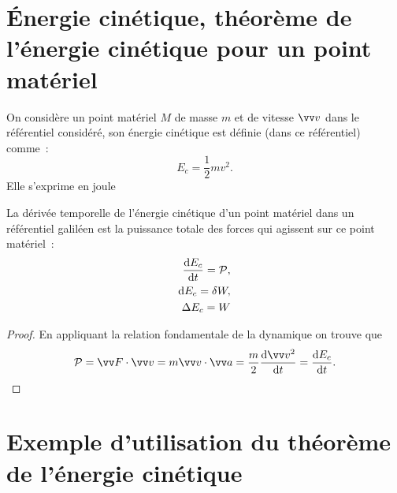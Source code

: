 \section{Énergie cinétique, théorème de l'énergie cinétique pour un point 
matériel}%
\label{chap4-sec:ernergiecinetique}%

\begin{defdef}%
  On considère un point matériel \(M\) de masse \(m\) et de vitesse \(\vvv\) 
  dans le référentiel considéré, son énergie cinétique est définie (dans ce 
  référentiel) comme~:
  \begin{equation}
    E_c = \frac{1}{2} m v^2.
  \end{equation}
  Elle s'exprime en joule
\end{defdef}%
\begin{theo}%
  La dérivée temporelle de l'énergie cinétique d'un point matériel dans un 
  référentiel galiléen est la puissance totale des forces qui agissent sur ce 
  point matériel~:
  \begin{align}
    \dfrac{\mathrm{d} E_c}{\mathrm{d} t} = \mathcal{P}, \\
    \mathop{}\mathopen{}\mathrm{d} E_c = \delta W, \\
    \Delta E_c = W
  \end{align}
\end{theo}%
\begin{proof}%
  En appliquant la relation fondamentale de la dynamique on trouve que
  \begin{equation}
    \P = \vF \cdot \vvv = m \vvv \cdot \va = \frac{m}{2} \derived{\vvv^2}{t} = 
    \derived{E_c}{t}.
  \end{equation}
\end{proof}%

\section{Exemple d'utilisation du théorème de l'énergie cinétique}%
\label{chap4-sec:exempletheoremeenergiecinetique}%

